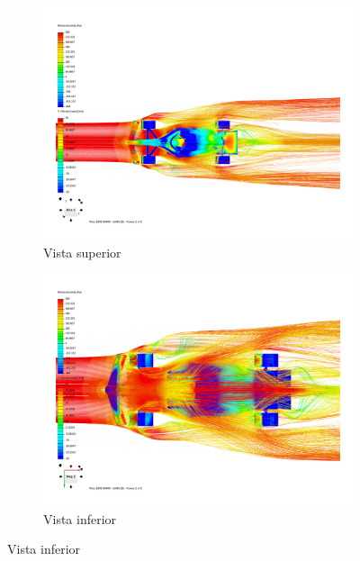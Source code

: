 \documentclass[colTwo]{NanouparIEEE}
\begin{document}
            \begin{figure}[htbp]
                \centering
                \begin{subfigure}[b]{0.235\textwidth}
                    \includegraphics[width=\textwidth]{images/Image_5-Superior.png}
                    \caption{Vista superior}
                    \label{subFig.superior}
                \end{subfigure}
                \hfill
                \begin{subfigure}[b]{0.235\textwidth}
                    \includegraphics[width=\textwidth]{images/Image_6-Inferior.png}
                    \caption{Vista inferior}
                    \label{subFig.inferior}
                \end{subfigure}

\end{figure}
\end{document}
